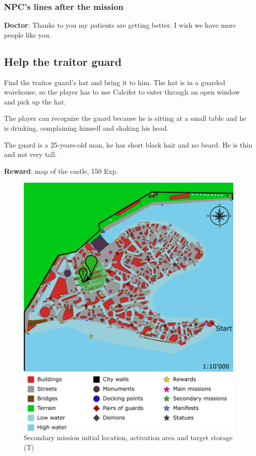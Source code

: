 \subsubsection*{NPC's lines after the mission}
\textbf{Doctor}: Thanks to you my patients are getting better. I wish we have more people like you.


\subsection{Help the traitor guard}
Find the traitor guard's hat and bring it to him. The hat is in a guarded warehouse, so the player has to use Calcifer to enter through an open window and pick up the hat.

The player can recognize the guard because he is sitting at a small table and he is drinking, complaining himself and shaking his head.

The guard is a 25-years-old man, he has short black hair and no beard. He is thin and not very tall.

\textbf{Reward}: map of the castle, 150 Exp.

\begin{figure}[H]
  \centering
  \includegraphics[width=\textwidth]{../Images/Maps/dynamiaSecondaryMissions_Guard}
  \caption{Secondary mission initial location, activation area and target storage (T)}
\end{figure}


